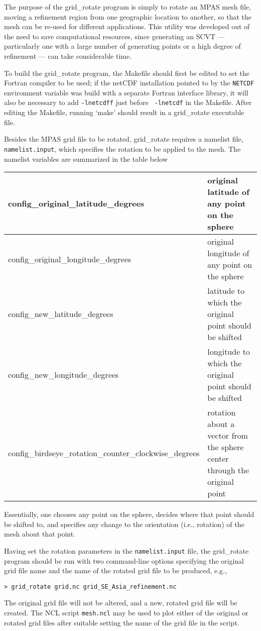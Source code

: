 The purpose of the grid\_rotate program is simply to rotate an MPAS mesh file,
moving a refinement region from one geographic location to another, so that the
mesh can be re-used for different applications. This utility was developed out
of the need to save computational resources, since generating an SCVT ---
particularly one with a large number of generating points or a high degree of
refinement --- can take considerable time.

To build the grid\_rotate program, the Makefile should first be edited to set
the Fortran compiler to be used; if the netCDF installation pointed to by the
{\tt NETCDF} environment variable was build with a separate Fortran interface
library, it will also be necessary to add {\tt -lnetcdff} just before {\tt
-lnetcdf} in the Makefile. After editing the Makefile, running `make' should
result in a grid\_rotate executable file.

Besides the MPAS grid file to be rotated, grid\_rotate requires a namelist file,
{\tt namelist.input}, which specifies the rotation to be applied to the mesh.
The namelist variables are summarized in the table below
   
\vspace{12pt}
\begin{longtable}{|p{3.25in} |p{2.5in}|}
\hline
config\_original\_latitude\_degrees & original latitude of any point on the sphere \\ \hline
config\_original\_longitude\_degrees & original longitude of any point on the sphere \\ \hline
config\_new\_latitude\_degrees &  latitude to which the original point should be shifted \\ \hline
config\_new\_longitude\_degrees &  longitude to which the original point should be shifted \\ \hline
config\_birdseye\_rotation\_counter\_clockwise\_degrees & rotation about a vector from the sphere center through the original point \\ \hline
\end{longtable}
\vspace{12pt}

\noindent Essentially, one chooses any point on the sphere, decides where that
point should be shifted to, and specifies any change to the orientation (i.e.,
rotation) of the mesh about that point. 

Having set the rotation parameters in the {\tt namelist.input} file, the
grid\_rotate program should be run with two command-line options specifying the
original grid file name and the name of the rotated grid file to be produced,
e.g.,

\vspace{12pt}
{\tt > grid\_rotate grid.nc grid\_SE\_Asia\_refinement.nc}
\vspace{12pt}

The original grid file will not be altered, and a new, rotated grid file will be
created. The NCL script {\tt mesh.ncl} may be used to plot either of the
original or rotated grid files after suitable setting the name of the grid file
in the script.
   
